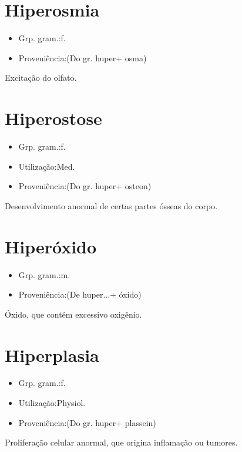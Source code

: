 \documentclass{article}
\begin{document}
\section{Hiperosmia}
\begin{itemize}
\item {Grp. gram.:f.}
\end{itemize}
\begin{itemize}
\item {Proveniência:(Do gr. \textunderscore huper\textunderscore  + \textunderscore osma\textunderscore )}
\end{itemize}
Excitação do olfato.
\section{Hiperostose}
\begin{itemize}
\item {Grp. gram.:f.}
\end{itemize}
\begin{itemize}
\item {Utilização:Med.}
\end{itemize}
\begin{itemize}
\item {Proveniência:(Do gr. \textunderscore huper\textunderscore  + \textunderscore osteon\textunderscore )}
\end{itemize}
Desenvolvimento anormal de certas partes ósseas do corpo.
\section{Hiperóxido}
\begin{itemize}
\item {Grp. gram.:m.}
\end{itemize}
\begin{itemize}
\item {Proveniência:(De \textunderscore huper...\textunderscore  + \textunderscore óxido\textunderscore )}
\end{itemize}
Óxido, que contém excessivo oxigênio.
\section{Hiperplasia}
\begin{itemize}
\item {Grp. gram.:f.}
\end{itemize}
\begin{itemize}
\item {Utilização:Physiol.}
\end{itemize}
\begin{itemize}
\item {Proveniência:(Do gr. \textunderscore huper\textunderscore  + \textunderscore plassein\textunderscore )}
\end{itemize}
Proliferação celular anormal, que origina inflamação ou tumores.
\end{document}
